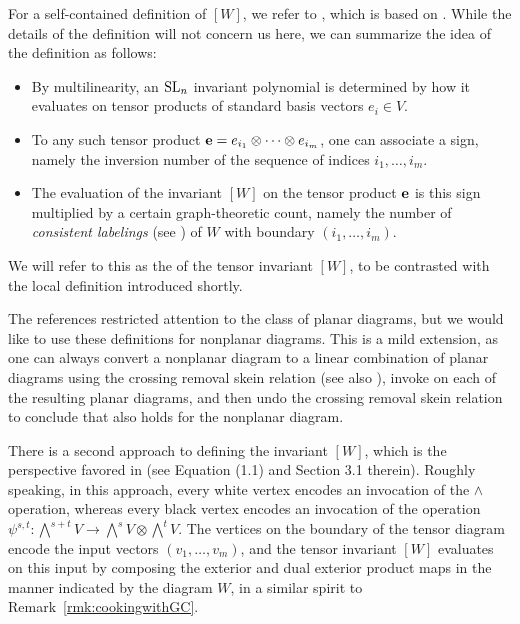 For a self-contained definition of $[W]$, we refer to \cite[Definition 4.1]{Fraser:2column}, which is based on \cite[Lemma 5.4]{Fraser.Lam.Le}. While the details of the definition will not concern us here, we can summarize the idea of the definition as follows:
\begin{itemize}
    \item By multilinearity, an ${\rm SL}_n$ invariant polynomial is determined by how it evaluates on tensor products of standard basis vectors $e_i \in V$.
    \item To any such tensor product ${\bf e} = e_{i_1} \otimes \cdots \otimes e_{i_m}$, one can associate a sign, namely the inversion number of the sequence of indices $i_1,\dots,i_m$. 
    \item The evaluation of the invariant $[W]$ on the tensor product ${\bf e}$ is this sign multiplied by a certain graph-theoretic count, namely the number of \emph{consistent labelings} (see \cite[Definition~3.1]{Fraser:2column}) of $W$ with boundary $(i_1,\dots,i_m)$.   
\end{itemize} 

We will refer to this as the  of the tensor invariant $[W]$, to be contrasted with the local definition introduced shortly.

\begin{remark}
The references \cite{Fraser:2column, Fraser.Lam.Le} restricted attention to the class of planar diagrams, but we would like to use these definitions for nonplanar diagrams. This is a mild extension, as one can always convert a nonplanar diagram to a linear combination of planar diagrams using the crossing removal skein relation \cite[Corollary 6.2.3]{Cautis.Kamnitzer.Morrison} (see also \cite[Equation (34)]{Fraser.Pylyavskyy}), invoke \cite[Lemma 5.4]{Fraser.Lam.Le} on each of the resulting planar diagrams, and then undo the crossing removal skein relation to conclude that \cite[Lemma 5.4]{Fraser.Lam.Le} also holds for the nonplanar diagram.
\end{remark}

There is a second approach to defining the invariant $[W]$, which is the perspective favored in \cite{Cautis.Kamnitzer.Morrison} (see \eg Equation (1.1) and Section 3.1 therein). Roughly speaking, in this  approach, every white vertex encodes an invocation of the $\wedge$ operation, whereas every black vertex encodes an invocation of the  operation $\psi^{s,t} \colon \bigwedge^{s+t}V \to \bigwedge^s V \otimes \bigwedge^tV$. The vertices on the boundary of the tensor diagram encode the input vectors $(v_1,\dots,v_m)$, and the tensor invariant $[W]$ evaluates on this input by composing the exterior and dual exterior product maps in the manner indicated by the diagram $W$, in a similar spirit to Remark~\ref{rmk:cookingwithGC}. 



